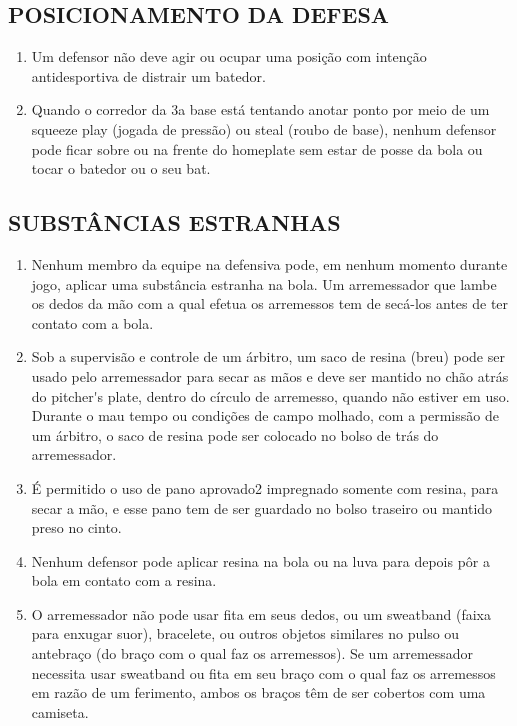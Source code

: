 \subsection{POSICIONAMENTO DA DEFESA}

\begin{enumerate}[label=(\alph*)]
	\item   Um defensor não deve agir ou ocupar uma posição com intenção antidesportiva de distrair um batedor.
	\item  Quando o corredor da 3a base está tentando anotar ponto por meio de um  \gls{squeeze play} (jogada de pressão) ou \gls{steal} (roubo de base), nenhum defensor  pode ficar sobre ou na frente do \gls{homeplate} sem estar de posse da bola ou tocar o batedor ou o seu \gls{bat}.
\end{enumerate}

\subsection{SUBSTÂNCIAS ESTRANHAS}
\begin{enumerate}[label=(\alph*)]
	\item   Nenhum membro da equipe na defensiva pode, em nenhum momento durante jogo, aplicar uma substância estranha na bola. Um arremessador que lambe os dedos da mão com a qual efetua os arremessos tem de secá-los antes de ter contato com a bola.
	\item  Sob a supervisão e controle de um árbitro, um saco de resina (breu) pode ser usado pelo arremessador para secar as mãos e deve ser mantido no chão atrás do \gls{pitcher's plate}, dentro do círculo de arremesso, quando não estiver em uso. Durante o mau tempo ou condições de campo  molhado, com a permissão de um árbitro, o saco de resina pode ser colocado no bolso de trás do arremessador.
	\item  É permitido o uso de pano aprovado2 impregnado somente com resina, para secar a mão, e esse pano tem de ser guardado no bolso traseiro ou mantido preso no cinto.
	\item  Nenhum defensor pode aplicar resina na bola ou na luva para depois pôr a bola em contato com a resina.
	\item  O arremessador não pode usar fita em seus dedos, ou um \gls{sweatband} (faixa para enxugar suor), bracelete, ou outros objetos similares no pulso ou antebraço	(do braço com o qual faz os arremessos). Se um arremessador necessita usar \gls{sweatband} ou fita em seu braço com o qual faz os arremessos em razão de um ferimento, ambos os braços têm de ser cobertos com uma camiseta.
\end{enumerate}

